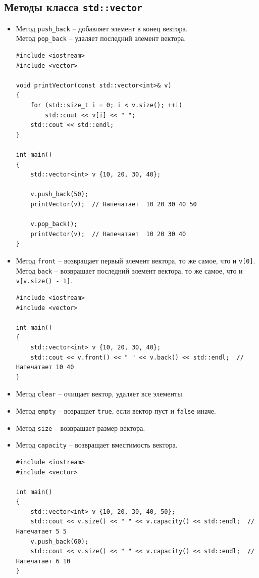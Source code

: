 \documentclass{article}
\begin{document}
\subsection*{Методы класса \texttt{std::vector}}
\begin{itemize}
\item Метод \texttt{push\_back} -- добавляет элемент в конец вектора.\\
Метод \texttt{pop\_back} -- удаляет последний элемент вектора.
\begin{lstlisting}
#include <iostream>
#include <vector>

void printVector(const std::vector<int>& v)
{
    for (std::size_t i = 0; i < v.size(); ++i)
        std::cout << v[i] << " ";
    std::cout << std::endl;
}

int main()
{
    std::vector<int> v {10, 20, 30, 40};
    
    v.push_back(50);
    printVector(v);  // Напечатает  10 20 30 40 50
    
    v.pop_back();
    printVector(v);  // Напечатает  10 20 30 40
}
\end{lstlisting}

\item Метод \texttt{front} -- возвращает первый элемент вектора, то же самое, что и \texttt{v[0]}. Метод \texttt{back} -- возвращает последний элемент вектора, то же самое, что и \texttt{v[v.size() - 1]}.
\begin{lstlisting}
#include <iostream>
#include <vector>

int main()
{
    std::vector<int> v {10, 20, 30, 40};
    std::cout << v.front() << " " << v.back() << std::endl;  // Напечатает 10 40
}
\end{lstlisting}

\item Метод \texttt{clear} -- очищает вектор, удаляет все элементы.
\item Метод \texttt{empty} -- возращает \texttt{true}, если вектор пуст и \texttt{false} иначе.
\item Метод \texttt{size} -- возвращает размер вектора.
\item Метод \texttt{capacity} -- возвращает вместимость вектора.
\begin{lstlisting}
#include <iostream>
#include <vector>

int main()
{
    std::vector<int> v {10, 20, 30, 40, 50};
    std::cout << v.size() << " " << v.capacity() << std::endl;  // Напечатает 5 5
    v.push_back(60);
    std::cout << v.size() << " " << v.capacity() << std::endl;  // Напечатает 6 10
}
\end{lstlisting}


\end{itemize}
\end{document}
